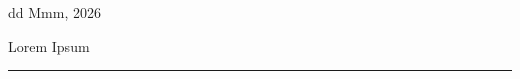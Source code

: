\documentclass[a4paper,12pt]{article}
\begin{document}
\pagecolor{background}
\color{foreground}

\par{
	\flushleft\large
	dd Mmm, 2026
}

\par{\Huge
	\flushleft{}
	Lorem Ipsum
}

\noindent\rule{\linewidth}{0.4pt}

\ls{

}
\end{document}
